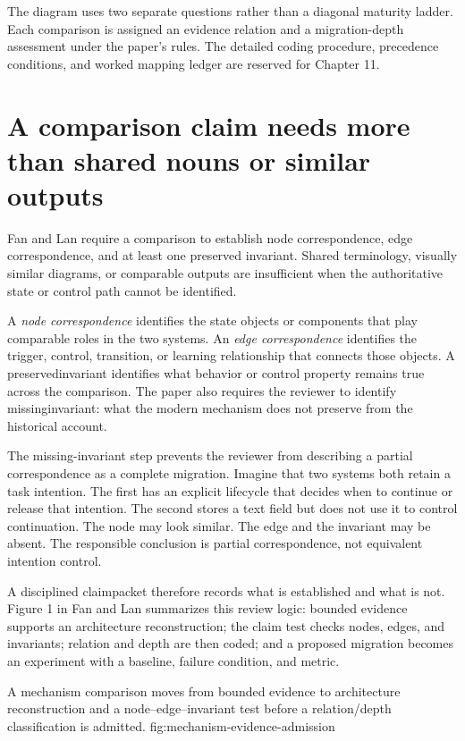 The diagram uses two separate questions rather than a diagonal maturity ladder. Each comparison is assigned an evidence relation and a migration-depth assessment under the paper's rules. The detailed coding procedure, precedence conditions, and worked mapping ledger are reserved for Chapter 11.

\section{A comparison claim needs more than shared nouns or similar outputs}
\label{sec:claim-test}

Fan and Lan require a comparison to establish node correspondence, edge correspondence, and at least one preserved invariant. Shared terminology, visually similar diagrams, or comparable outputs are insufficient when the authoritative state or control path cannot be identified.

A \emph{node correspondence} identifies the state objects or components that play comparable roles in the two systems. An \emph{edge correspondence} identifies the trigger, control, transition, or learning relationship that connects those objects. A \gls{preservedinvariant} identifies what behavior or control property remains true across the comparison. The paper also requires the reviewer to identify \gls{missinginvariant}: what the modern mechanism does not preserve from the historical account.

The missing-invariant step prevents the reviewer from describing a partial correspondence as a complete migration. Imagine that two systems both retain a task intention. The first has an explicit lifecycle that decides when to continue or release that intention. The second stores a text field but does not use it to control continuation. The node may look similar. The edge and the invariant may be absent. The responsible conclusion is partial correspondence, not equivalent intention control.

A disciplined \gls{claimpacket} therefore records what is established and what is not. Figure 1 in Fan and Lan summarizes this review logic: bounded evidence supports an architecture reconstruction; the claim test checks nodes, edges, and invariants; relation and depth are then coded; and a proposed migration becomes an experiment with a baseline, failure condition, and metric.

  {A mechanism comparison moves from bounded evidence to architecture reconstruction and a node--edge--invariant test before a relation/depth classification is admitted.}
  {fig:mechanism-evidence-admission}


